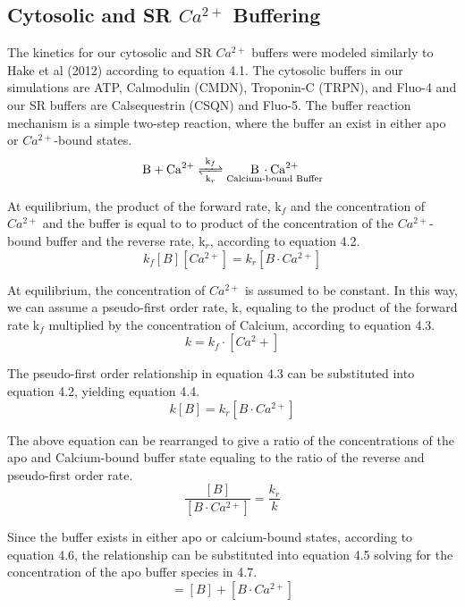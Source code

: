 \documentclass[12pt]{ucsddissertation}
\begin{document}
\subsection{Cytosolic and SR $Ca^{2+}$ Buffering}


The kinetics for our cytosolic and SR $Ca^{2+}$ buffers were modeled similarly to Hake et al (2012) according to equation 4.1. The cytosolic buffers in our simulations are ATP, Calmodulin (CMDN), Troponin-C (TRPN), and Fluo-4 and our SR buffers are Calsequestrin (CSQN) and Fluo-5.  The buffer reaction mechanism is a simple two-step reaction, where the buffer an exist in either apo or $Ca^{2+}$-bound states. 
\begin{equation} 
\ce{B + Ca^2+  <=>[\ce{k_{f}}][\ce{k_{r}}]
$\underset{\text{Calcium-bound Buffer}}{\ce{B \cdot Ca^{2+}}}$
}
\end{equation}

At equilibrium, the product of the forward rate, k$_{f}$ and the concentration of $Ca^{2+}$  and the buffer is equal to to product of the concentration of the $Ca^{2+}$-bound buffer and the reverse rate, k$_{r}$, according to equation 4.2.  
\begin{equation}
k_{f}[B][Ca^{2+}] = k_{r}[B \cdot Ca^{2+}]
\end{equation}

At equilibrium, the concentration of $Ca^{2+}$ is assumed to be constant. In this way, we can assume a pseudo-first order rate, k, equaling to the product of the forward rate k$_{f}$ multiplied by the concentration of Calcium, according to equation 4.3. 
\begin{equation}
 k = k_{f} \cdot [Ca^2+]
\end{equation}

The pseudo-first order relationship in equation 4.3 can be substituted into equation 4.2, yielding equation 4.4.
\begin{equation}
k[B] = k_{r}[B \cdot Ca^{2+}]
\end{equation}

The above equation can be rearranged to give a ratio of the concentrations of the apo and Calcium-bound buffer state equaling to the ratio of the reverse and pseudo-first order rate.
\begin{equation}
\frac{[B]}{[B  \cdot Ca^{2+}]} = \frac{k_{r}}{k} 
\end{equation}

Since the buffer exists in either apo or calcium-bound states, according to equation 4.6, the relationship can be substituted into equation 4.5 solving for the concentration of the apo buffer species in 4.7. 
\begin{equation}
[Total_{B}] = [B] + [B \cdot Ca^{2+}] 
\end{equation}
\end{document}
